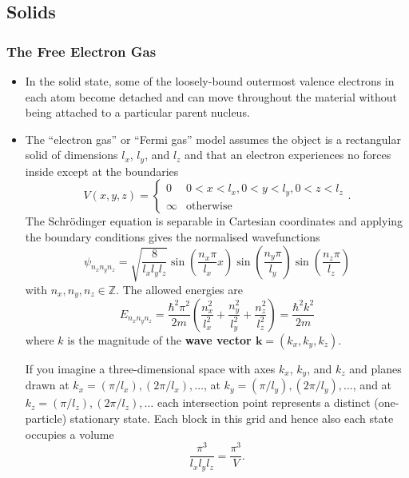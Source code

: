\documentclass{article}
\renewcommand{\vec}[1]{\boldsymbol{\mathbf{#1}}}
\begin{document}
\subsection{Solids}

\subsubsection{The Free Electron Gas}

\begin{itemize}
  \item In the solid state, some of the loosely-bound outermost valence electrons in each atom become detached and can move throughout the material without being attached to a particular parent nucleus.

  \item The ``electron gas'' or ``Fermi gas'' model assumes the object is a rectangular solid of dimensions $l_x$, $l_y$, and $l_z$ and that an electron experiences no forces inside except at the boundaries \[V(x, y, z) = \begin{cases}
            0      & 0 < x < l_x, 0 < y < l_y, 0 < z < l_z \\
            \infty & \text{otherwise}
          \end{cases}.\] The Schrödinger equation is separable in Cartesian coordinates and applying the boundary conditions gives the normalised wavefunctions \[\psi_{n_x n_y n_z} = \sqrt{\frac{8}{l_x l_y l_z}} \sin \left( \frac{n_x \pi}{l_x} x \right) \sin \left( \frac{n_y \pi}{l_y} \right) \sin \left( \frac{n_z \pi}{l_z} \right)\] with $n_x, n_y, n_z \in \mathbb{Z}$. The allowed energies are \[E_{n_x n_y n_z} = \frac{\hbar^2 \pi^2}{2 m} \left( \frac{n_x^2}{l_x^2} + \frac{n_y^2}{l_y^2} + \frac{n_z^2}{l_z^2} \right) = \frac{\hbar^2 k^2}{2 m}\] where $k$ is the magnitude of the \textbf{wave vector $\vec{k} = (k_x, k_y, k_z)$}.

        If you imagine a three-dimensional space with axes $k_x$, $k_y$, and $k_z$ and planes drawn at $k_x = (\pi / l_x), (2 \pi / l_x), \ldots$, at $k_y = (\pi / l_y), (2 \pi / l_y), \ldots$, and at $k_z = (\pi / l_z), (2 \pi / l_z), \ldots$ each intersection point represents a distinct (one-particle) stationary state. Each block in this grid and hence also each state occupies a volume \[\frac{\pi^3}{l_x l_y l_z} = \frac{\pi^3}{V}.\]


\end{itemize}
\end{document}
